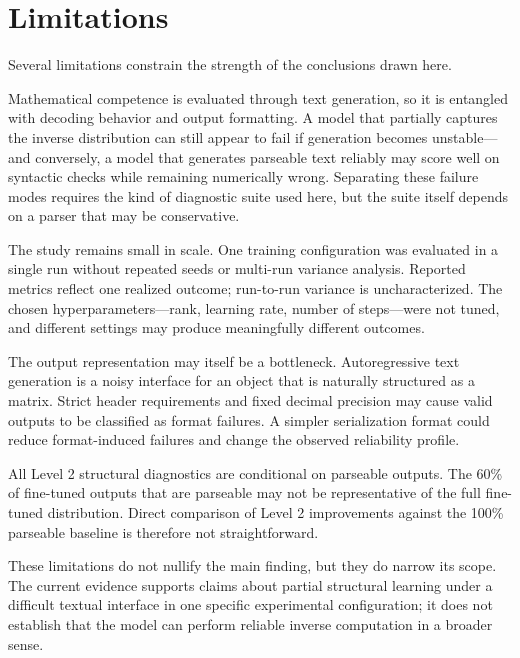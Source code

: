 \section{Limitations}
\label{sec:limitations}

Several limitations constrain the strength of the conclusions drawn here.

Mathematical competence is evaluated through text generation, so it is entangled with decoding behavior and output formatting. A model that partially captures the inverse distribution can still appear to fail if generation becomes unstable---and conversely, a model that generates parseable text reliably may score well on syntactic checks while remaining numerically wrong. Separating these failure modes requires the kind of diagnostic suite used here, but the suite itself depends on a parser that may be conservative.

The study remains small in scale. One training configuration was evaluated in a single run without repeated seeds or multi-run variance analysis. Reported metrics reflect one realized outcome; run-to-run variance is uncharacterized. The chosen hyperparameters---rank, learning rate, number of steps---were not tuned, and different settings may produce meaningfully different outcomes.

The output representation may itself be a bottleneck. Autoregressive text generation is a noisy interface for an object that is naturally structured as a matrix. Strict header requirements and fixed decimal precision may cause valid outputs to be classified as format failures. A simpler serialization format could reduce format-induced failures and change the observed reliability profile.

All Level 2 structural diagnostics are conditional on parseable outputs. The 60\% of fine-tuned outputs that are parseable may not be representative of the full fine-tuned distribution. Direct comparison of Level 2 improvements against the 100\% parseable baseline is therefore not straightforward.

These limitations do not nullify the main finding, but they do narrow its scope. The current evidence supports claims about partial structural learning under a difficult textual interface in one specific experimental configuration; it does not establish that the model can perform reliable inverse computation in a broader sense.
